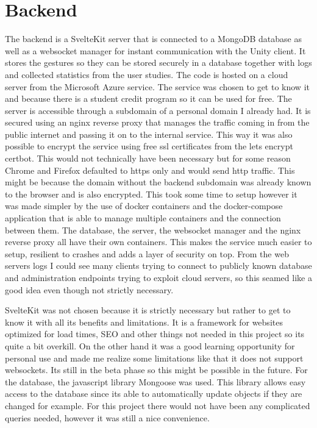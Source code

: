 




\section{Backend}

The backend is a SvelteKit server that is connected to a MongoDB database as well as a websocket manager for instant communication with the Unity client. It stores the gestures so they can be stored securely in a database together with logs and collected statistics from the user studies. The code is hosted on a cloud server from the Microsoft Azure service. The service was chosen to get to know it and because there is a student credit program so it can be used for free. The server is accessible through a subdomain of a personal domain I already had. It is secured using an nginx reverse proxy that manages the traffic coming in from the public internet and passing it on to the internal service. This way it was also possible to encrypt the service using free ssl certificates from the lets encrypt certbot. This would not technically have been necessary but for some reason Chrome and Firefox defaulted to https only and would send http traffic. This might be because the domain without the backend subdomain was already known to the browser and is also encrypted. This took some time to setup however it was made simpler by the use of docker containers and the docker-compose application that is able to manage multiple containers and the connection between them. The database, the server, the websocket manager and the nginx reverse proxy all have their own containers. This makes the service much easier to setup, resilient to crashes and adds a layer of security on top. From the web servers logs I could see many clients trying to connect to publicly known database and administration endpoints trying to exploit cloud servers, so this seamed like a good idea even though not strictly necessary. 

SvelteKit was not chosen because it is strictly necessary but rather to get to know it with all its benefits and limitations. It is a framework for websites optimized for load times, SEO and other things not needed in this project so its quite a bit overkill. On the other hand it was a good learning opportunity for personal use and made me realize some limitations like that it does not support websockets. Its still in the beta phase so this might be possible in the future. For the database, the javascript library Mongoose was used. This library allows easy access to the database since its able to automatically update objects if they are changed for example. For this project there would not have been any complicated queries needed, however it was still a nice convenience. 


